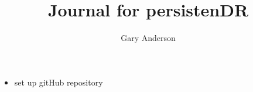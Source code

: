 \documentclass[hyperref]{labbook}
\begin{document}
\frontmatter
\title{Journal for persistenDR}
\author{Gary Anderson }
\maketitle

\tableofcontents



\mainmatter


\begin{itemize}
\item set up gitHub repository
\end{itemize}



\printindex
\end{document}

